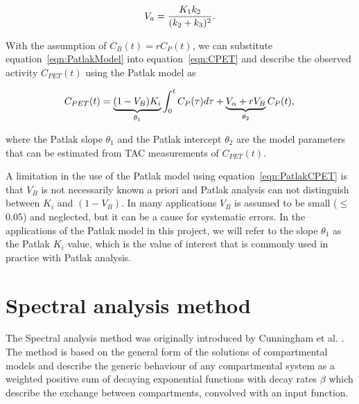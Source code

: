 \begin{equation} 
V_a  = \frac{K_1 k_2}{(k_2+k_3)^2} \\ . \\ 
\end{equation}

With the assumption of $C_{B}(t) = r C_{P}(t)$, we can substitute equation~\ref{eqn:PatlakModel} into equation~\ref{eqn:CPET} and describe the observed activity $C_{PET}(t)$ using the Patlak model as

\begin{equation} 
{C_{PET}}(t)  = \underbrace{(1-V_{B})K_i}_{\theta_1} \int_{0}^{t} C_{P}(\tau) d\tau +  \underbrace{V_{\alpha}+r V_{B}}_{\theta_2} C_{P}(t) \\ , \\
\label{eqn:PatlakCPET}
\end{equation}

where the Patlak slope $\theta_1$ and the Patlak intercept $\theta_2$ are the model parameters that can be estimated from TAC measurements of ${C_{PET}}(t)$. 

A limitation in the use of the Patlak model using equation~\ref{eqn:PatlakCPET} is that $V_B$ is not necessarily known a priori and Patlak analysis can not distinguish between $K_i$ and $(1-V_B)$. In many applications $V_B$ is assumed to be small ($\leq$0.05) and neglected, but it can be a cause for systematic errors. 
In the applications of the Patlak model in this project, we will refer to the slope $\theta_1$ as the Patlak $K_i$ value, which is the value of interest that is commonly used in practice with Patlak analysis.


\section{Spectral analysis method}
The Spectral analysis method was originally introduced by Cunningham et al. \cite{Cunningham1993}. The method is based on the general form of the solutions of compartmental models and describe the generic behaviour of any compartmental system as a weighted positive sum of decaying exponential functions with decay rates $\beta$ which describe the exchange between compartments, convolved with an input function. 

